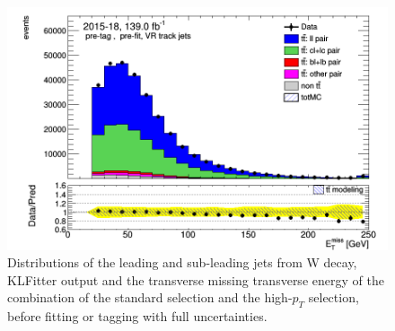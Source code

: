 \documentclass[letterpaper,12pt]{article}
\begin{document}
\begin{figure}
\begin{minipage}[b]{.45\textwidth}
	\end{minipage}\hfill
	\begin{minipage}[b]{.45\textwidth}
	\centering
	\includegraphics[width=1\textwidth]{Oct_distributions/pretagNoRwDL1rwithhighpTVRJets_scaledall/DataMC_MET.png}
	\end{minipage}
	\caption{Distributions of the leading and sub-leading jets 
	from W decay, KLFitter output and the transverse missing transverse 
	energy of the combination of the standard selection and the 
	high-$p_T$ selection, before fitting or tagging with 
	full uncertainties.} \label{fig:jets_VRJets}
	\end{figure}
	
	
	
\end{document}
